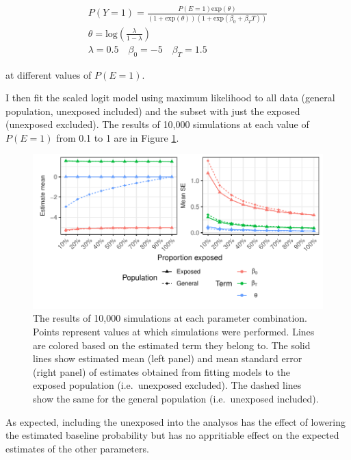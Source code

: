 \documentclass[
]{article}
\begin{document}
\[
\begin{gathered}
P(Y=1) = \frac{P(E=1)\text{exp}(\theta)}{(1+\text{exp}(\theta))(1+\text{exp}(\beta_0+\beta_T T))} \\
\theta = \text{log}(\frac{\lambda}{1-\lambda}) \\
\lambda = 0.5 \quad \beta_0 = -5 \quad \beta_T = 1.5
\end{gathered}
\]

at different values of \(P(E=1)\).

I then fit the scaled logit model using maximum likelihood to all data (general population, unexposed included) and the subset with just the exposed (unexposed excluded). The results of 10,000 simulations at each value of \(P(E=1)\) from 0.1 to 1 are in Figure \ref{fig:plot-10000sims}.



\begin{figure}

{\centering \includegraphics{sim-plot/plot-10000sims} 

}

\caption{The results of 10,000 simulations at each parameter combination. Points represent values at which simulations were performed. Lines are colored based on the estimated term they belong to. The solid lines show estimated mean (left panel) and mean standard error (right panel) of estimates obtained from fitting models to the exposed population (i.e.~unexposed excluded). The dashed lines show the same for the general population (i.e.~unexposed included).}\label{fig:plot-10000sims}
\end{figure}

As expected, including the unexposed into the analysos has the effect of lowering the estimated baseline probability but has no appritiable effect on the expected estimates of the other parameters.
\end{document}
